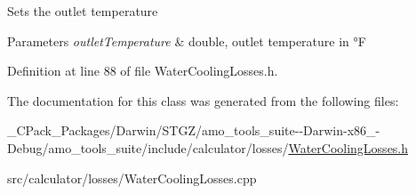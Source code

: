 Sets the outlet temperature 
\begin{DoxyParams}{Parameters}
{\em outlet\+Temperature} & double, outlet temperature in °F \\
\hline
\end{DoxyParams}


Definition at line 88 of file Water\+Cooling\+Losses.\+h.



The documentation for this class was generated from the following files\+:\begin{DoxyCompactItemize}
\item 
\+\_\+\+C\+Pack\+\_\+\+Packages/\+Darwin/\+S\+T\+G\+Z/amo\+\_\+tools\+\_\+suite-\/-\/\+Darwin-\/x86\+\_-\/\+Debug/amo\+\_\+tools\+\_\+suite/include/calculator/losses/\hyperlink{___c_pack___packages_2_darwin_2_s_t_g_z_2amo__tools__suite--_darwin-x86__64-_debug_2amo__tools__00eea4dd819e0d65bc0d16cf8790f94c}{Water\+Cooling\+Losses.\+h}\item 
src/calculator/losses/Water\+Cooling\+Losses.\+cpp\end{DoxyCompactItemize}
